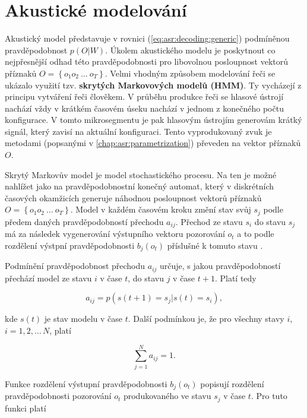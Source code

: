 \section{Akustické modelování}
\label{chap:asr:acoustic}

Akustický model představuje v rovnici (\ref{eq:asr:decoding:generic}) podmíněnou pravděpodobnost $p(O|W)$. Úkolem akustického modelu je poskytnout co nejpřesnější odhad této pravděpodobnosti pro libovolnou posloupnost vektorů příznaků $O = \left\{o_1 o_2\ \dots\ o_T\right\}$. Velmi vhodným způsobem modelování řeči se ukázalo využití tzv. \textbf{skrytých Markovových modelů (HMM)}. Ty vycházejí z principu vytváření řeči člověkem. V průběhu produkce řeči se hlasové ústrojí nachází vždy v krátkém časovém úseku nachází v jednom z konečného počtu konfigurace. V tomto mikrosegmentu je pak hlasovým ústrojím generovám krátký signál, který zavisí na aktuální konfiguraci. Tento vyprodukovaný zvuk je metodami (popsanými v \ref{chap:asr:parametrization}) převeden na vektor příznaků $O$.

Skrytý Markovův model je model stochastického procesu. Na ten je možné nahlížet jako na pravděpodobnostní konečný automat, který v diskrétních časových okamžicích generuje náhodnou posloupnost vektorů příznaků $O = \left\{o_1 o_2\ \dots\ o_T\right\}$. Model v každém časovém kroku změní stav svůj $s_j$ podle předem daných pravděpodobností přechodu $a_{ij}$. Přechod ze stavu $s_i$ do stavu $s_j$ má za následek vygenerování výstupního vektoru pozorování $o_t$ a to podle rozdělení výstpní pravděpodobnosti $b_j\left(o_t\right)$ příslušné k tomuto stavu \cite{Psutka2006}.

Podmínění pravděpodobnost přechodu $a_{ij}$ určuje, s jakou pravděpodobností přechází model ze stavu $i$ v čase $t$, do stavu $j$ v čase $t+1$. Platí tedy

\begin{equation}
  a_{ij} = p\left(s\left(t+1\right)=s_j|s\left(t\right)=s_i\right),
  \label{eq:asr:acoustic:conditional}
\end{equation}

\noindent kde $s\left(t\right)$ je stav modelu v čase $t$. Další podmínkou je, že pro všechny stavy $i$, $i=1,2,\dots\,N$, platí

\begin{equation}
  \sum_{j=1}^{N} a_{ij} = 1.
  \label{eq:asr:acoustic:state:condition}
\end{equation}

\noindent Funkce rozdělení výstupní pravděpodobnosti $b_j\left(o_t\right)$ popisují rozdělení pravděpodobnosti pozorování $o_t$ produkovaného ve stavu $s_j$ v čase $t$. Pro tuto funkci platí

